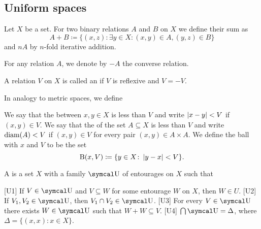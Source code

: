 \subsection{Uniform spaces}\label{subsec:uniform_spaces}

\begin{definition}\label{def:entourage}\cite[section 8.1]{Engelking1989}
  Let \( X \) be a set. For two binary relations \( A \) and \( B \) on \( X \) we define their sum as
  \begin{equation*}
    A + B \coloneqq \{ (x, z) \colon \exists y \in X: (x, y) \in A, (y, z) \in B \}
  \end{equation*}
  and \( nA \) by \( n \)-fold iterative addition.

  For any relation \( A \), we denote by \( -A \) the converse relation.

  A relation \( V \) on \( X \) is called an  if \( V \) is reflexive and \( V = -V \).

  In analogy to metric spaces, we define
  \begin{defenum}
     We say that the  between \( x, y \in X \) is less than \( V \) and write \( \left\vert x - y \right\vert < V \) if \( (x, y) \in V \).
     We say that the  of the set \( A \subseteq X \) is less than \( V \) and write \( \operatorname{diam}(A) < V \) if \( (x, y) \in V \) for every pair \( (x, y) \in A \times A \).
     We define the ball with  \( x \) and  \( V \) to be the set
    \begin{equation*}
      \operatorname{B}(x, V) \coloneqq \{ y \in X \colon \left\vert y - x \right\vert < V \}.
    \end{equation*}
  \end{defenum}
\end{definition}

\begin{definition}\label{def:uniform_space}\cite[section 8.1]{Engelking1989}
  A  is a set \( X \) with a family \( \U \) of entourages on \( X \) such that
  \begin{defenum}
    [U1] If \( V \in \U \) and \( V \subseteq W \) for some entourage \( W \) on \( X \), then \( W \in U \).
    [U2] If \( V_1, V_2 \in \U \), then \( V_1 \cap V_2 \in \U \).
    [U3] For every \( V \in \U \) there exists \( W \in \U \) such that \( W + W \subseteq V \).
    [U4] \( \bigcap \U = \Delta \), where \( \Delta = \{ (x, x) \colon x \in X \} \).
  \end{defenum}
\end{definition}

